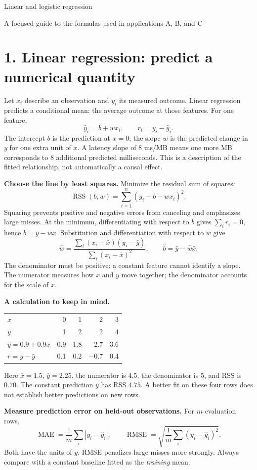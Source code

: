 \documentclass[11pt,a4paper]{article}
\begin{document}
{\LARGE\color{navy}Linear and logistic regression}\par
{\large A focused guide to the formulas used in applications A, B, and C}

\section*{1. Linear regression: predict a numerical quantity}
Let $x_i$ describe an observation and $y_i$ its measured outcome. Linear
regression predicts a conditional mean: the average outcome at those features.
For one feature,
\[
\widehat y_i=b+w x_i,\qquad r_i=y_i-\widehat y_i.
\]
The intercept $b$ is the prediction at $x=0$; the slope $w$ is the predicted
change in $y$ for one extra unit of $x$. A latency slope of 8 ms/MB means
one more MB corresponds to 8 additional predicted milliseconds. This is a
description of the fitted relationship, not automatically a causal effect.

\textbf{Choose the line by least squares.} Minimize the residual sum of squares:
\[
\operatorname{RSS}(b,w)=\sum_{i=1}^n(y_i-b-wx_i)^2.
\]
Squaring prevents positive and negative errors from canceling and emphasizes
large misses. At the minimum, differentiating with respect to $b$ gives
$\sum_i r_i=0$, hence $b=\bar y-w\bar x$. Substitution and differentiation
with respect to $w$ give
\[
\boxed{\widehat w=\frac{\sum_i(x_i-\bar x)(y_i-\bar y)}
{\sum_i(x_i-\bar x)^2},\qquad
\widehat b=\bar y-\widehat w\bar x.}
\]
The denominator must be positive: a constant feature cannot identify a slope.
The numerator measures how $x$ and $y$ move together; the denominator accounts
for the scale of $x$.

\textbf{A calculation to keep in mind.}
\begin{center}
\begin{tabular}{@{}lrrrr@{}}\toprule
$x$ & 0&1&2&3\\
$y$ & 1&2&2&4\\
$\widehat y=0.9+0.9x$ & 0.9&1.8&2.7&3.6\\
$r=y-\widehat y$ & 0.1&0.2&$-0.7$&0.4\\\bottomrule
\end{tabular}
\end{center}
Here $\bar x=1.5$, $\bar y=2.25$, the numerator is 4.5, the denominator is 5,
and RSS is $0.70$. The constant prediction $\bar y$ has RSS $4.75$.
A better fit on these four rows does not establish better predictions on new rows.

\textbf{Measure prediction error on held-out observations.}
For $m$ evaluation rows,
\[
\operatorname{MAE}=\frac1m\sum_i|y_i-\widehat y_i|,\qquad
\operatorname{RMSE}=\sqrt{\frac1m\sum_i(y_i-\widehat y_i)^2}.
\]
Both have the units of $y$. RMSE penalizes large misses more strongly.
Always compare with a constant baseline fitted as the \emph{training} mean.
\end{document}
